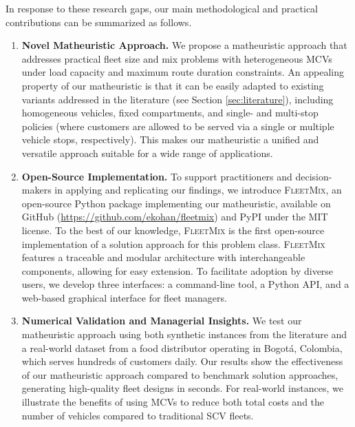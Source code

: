 \documentclass[11pt]{elsarticle}
\theoremstyle{plain}
\newcommand{\blue}[1]{#1}
\begin{document}
\blue{In response to these research gaps, o}ur main methodological and practical contributions can be summarized as follows.
\begin{enumerate}
    \item \textbf{Novel Matheuristic Approach.} We propose a matheuristic approach \blue{that addresses practical fleet size and mix problems with heterogeneous \acp{MCV} under load capacity and maximum route duration constraints}. 
    An appealing property of our matheuristic is that it can be easily adapted to existing variants addressed in the literature (see Section \ref{sec:literature}), including homogeneous vehicles, fixed compartments, and single- and multi-stop policies (where customers are allowed to be served via a single or multiple vehicle stops, respectively). This makes our matheuristic a unified and versatile approach suitable for a wide range of applications. 

    \item \textbf{Open-Source Implementation.} To support practitioners and decision-makers in applying and replicating our findings, we introduce \textsc{FleetMix}, an open-source Python package implementing our matheuristic, available on GitHub (\url{https://github.com/ekohan/fleetmix}) and PyPI under the MIT license. \blue{To the best of our knowledge, \textsc{FleetMix} is the first open-source implementation of a solution approach for this problem class.} \textsc{FleetMix} features a traceable and modular architecture with interchangeable components, allowing for easy extension. To facilitate adoption by diverse users, we develop three interfaces: a command-line tool, a Python API, and a web-based graphical interface for fleet managers.

    \item \textbf{Numerical Validation and Managerial Insights.} We test our matheuristic approach using both synthetic instances from the literature and a real-world dataset from a food distributor operating in Bogotá, Colombia, which serves hundreds of customers daily. Our results show the effectiveness of our matheuristic approach compared to benchmark solution approaches, generating high-quality fleet designs in seconds. For real-world instances, we illustrate the benefits of using \acp{MCV} to reduce both total costs and the number of vehicles compared to traditional \ac{SCV} fleets.
\end{enumerate}
\end{document}
